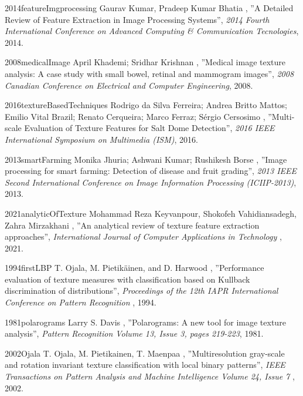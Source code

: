 \documentclass[a4paper,12pt,oneside]{book}%
\begin{document}
\begin{thebibliography}{xx}
	
	
	{2014}{featureImgprocessing}
	Gaurav Kumar, Pradeep Kumar Bhatia
	, ''A Detailed Review of Feature Extraction in Image Processing Systems'', {\em 2014 Fourth International Conference on Advanced Computing \& Communication Tecnologies}, 2014.
	
	{2008}{medicalImage}
	April Khademi; Sridhar Krishnan
	, ''Medical image texture analysis: A case study with small bowel, retinal and mammogram images'', {\em 2008 Canadian Conference on Electrical and Computer Engineering}, 2008.
	
	{2016}{textureBasedTechniques}
	Rodrigo da Silva Ferreira; Andrea Britto Mattos; Emilio Vital Brazil; Renato Cerqueira; Marco Ferraz; Sérgio Cersosimo
	, ''Multi-scale Evaluation of Texture Features for Salt Dome Detection'', {\em 2016 IEEE International Symposium on Multimedia (ISM)}, 2016.
	
	{2013}{smartFarming}
	Monika Jhuria; Ashwani Kumar; Rushikesh Borse
	, ''Image processing for smart farming: Detection of disease and fruit grading'', {\em 2013 IEEE Second International Conference on Image Information Processing (ICIIP-2013)}, 2013.
	
	
	{2021}{analyticOfTexture}
	Mohammad Reza Keyvanpour, Shokofeh Vahidiansadegh, Zahra Mirzakhani
	, ''An analytical review of texture feature extraction approaches'', {\em International Journal of Computer Applications in Technology }, 2021.
	
	{1994}{firstLBP}
	T. Ojala, M. Pietikäinen, and D. Harwood 
	, ''Performance evaluation of texture measures with classification based on Kullback discrimination of distributions'', {\em  Proceedings of the 12th IAPR International Conference on Pattern Recognition }, 1994.
	
	{1981}{polarograms}
	Larry S. Davis
	, ''Polarograms: A new tool for image texture analysis'', {\em  Pattern Recognition Volume 13, Issue 3, pages 219-223}, 1981.
	
	{2002}{Ojala}
	T. Ojala, M. Pietikainen, T. Maenpaa
	, ''Multiresolution gray-scale and rotation invariant texture classification with local binary patterns'', {\em  IEEE Transactions on Pattern Analysis and Machine Intelligence Volume 24, Issue 7 }, 2002.
	

\end{thebibliography}
\end{document}
